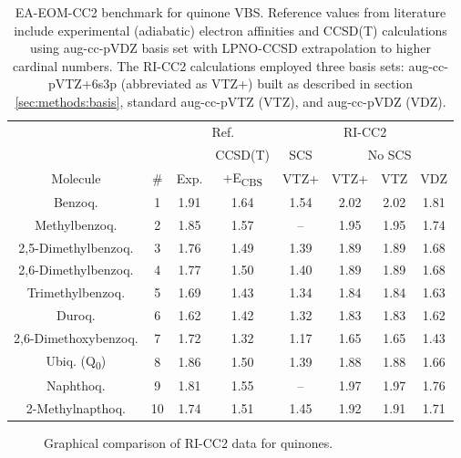 \begin{table}[h!]
  \centering
  \small
  \caption[EA-EOM-CC2 benchmark for quinone VBS.]{EA-EOM-CC2 benchmark for quinone VBS. Reference values from literature\cite{schulz2018systematic} include experimental (adiabatic) electron affinities and CCSD(T) calculations using aug-cc-pVDZ basis set with LPNO-CCSD extrapolation to higher cardinal numbers. The RI-CC2 calculations employed three basis sets: aug-cc-pVTZ+6s3p (abbreviated as VTZ+) built as described in section \ref{sec:methods:basis}, standard aug-cc-pVTZ (VTZ), and aug-cc-pVDZ (VDZ).}
  \label{tab:Quinones}
  \begin{tabular*}{\textwidth}{cccccccc}
  \toprule
   & & \multicolumn{2}{c}{Ref. \cite{schulz2018systematic}} & \multicolumn{4}{c}{RI-CC2}  \\
   \cmidrule(lr){3-4} \cmidrule(lr){5-8}
   & & & CCSD(T) & SCS & \multicolumn{3}{c}{No SCS} \\
  \cmidrule(lr){6-8}
  Molecule & \# & Exp. & +E\textsubscript{CBS} & VTZ+ & VTZ+ & VTZ & VDZ  \\
  \midrule
  Benzoq. & 1  & 1.91 & 1.64 & 1.54 & 2.02 & 2.02 & 1.81 \\
  Methylbenzoq. & 2  & 1.85 & 1.57 &  --  & 1.95 & 1.95 & 1.74 \\
  2,5-Dimethylbenzoq. & 3  & 1.76 & 1.49 & 1.39 & 1.89 & 1.89 & 1.68 \\
  2,6-Dimethylbenzoq. & 4  & 1.77 & 1.50 & 1.40 & 1.89 & 1.89 & 1.68 \\
  Trimethylbenzoq. & 5  & 1.69 & 1.43 & 1.34 & 1.84 & 1.84 & 1.63 \\
  Duroq. & 6  & 1.62 & 1.42 & 1.32 & 1.83 & 1.83 & 1.62 \\
  2,6-Dimethoxybenzoq. & 7  & 1.72 & 1.32 & 1.17 & 1.65 & 1.65 & 1.43 \\
  Ubiq. (Q\textsubscript{0}) & 8  & 1.86 & 1.50 & 1.39 & 1.88 & 1.88 & 1.66 \\
  Naphthoq. & 9  & 1.81 & 1.55 &  --  & 1.97 & 1.97 & 1.76 \\
  2-Methylnapthoq. & 10 & 1.74 & 1.51 & 1.45 & 1.92 & 1.91 & 1.71 \\
  \bottomrule
  \end{tabular*}
\end{table}


\begin{figure}[h!]
  \centering
  \small
  
  \caption{Graphical comparison of RI-CC2 data for quinones.}
  \label{fig:Quinones}
\end{figure}
  
